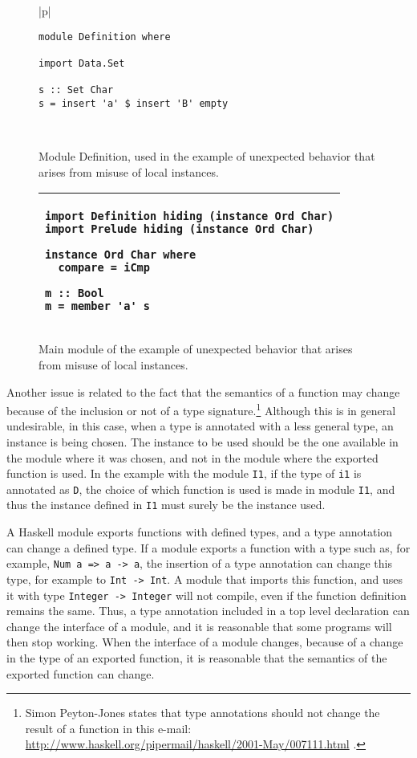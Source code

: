 \documentclass[msc]{ppgccufmg}
\begin{document}
\begin{figure}
\caption{Module Definition, used in the example of unexpected behavior that
  arises from misuse of local instances.\label{definition}}
\begin{tabular}{|p{\textwidth}|}
\hline
\begin{verbatim}
module Definition where

import Data.Set

s :: Set Char
s = insert 'a' $ insert 'B' empty
\end{verbatim}
\\
\hline
\end{tabular}
\end{figure}

\begin{figure}
\caption{Main module of the example of unexpected behavior that arises from
  misuse of local instances.\label{main-set}}
\begin{tabular}{|p{\textwidth}|}
\hline
\begin{verbatim}
import Definition hiding (instance Ord Char)
import Prelude hiding (instance Ord Char)

instance Ord Char where
  compare = iCmp

m :: Bool
m = member 'a' s
\end{verbatim}
\vspace{-0.7cm}\\
\hline
\end{tabular}
\end{figure}

Another issue is related to the fact that the semantics of a function
may change because of the inclusion or not of a type
signature.\footnote{Simon Peyton-Jones states that type annotations
  should not change the result of a function in this e-mail:
  \url{http://www.haskell.org/pipermail/haskell/2001-May/007111.html}
  .} Although this is in general undesirable, in this case, when a
type is annotated with a less general type, an instance is being
chosen.  The instance to be used should be the one available in the
module where it was chosen, and not in the module where the exported
function is used. In the example with the module \texttt{I1}, if the
type of \texttt{i1} is annotated as \texttt{D}, the choice of which
function is used is made in module \texttt{I1}, and thus the instance
defined in \texttt{I1} must surely be the instance used.

A Haskell module exports functions with defined types, and a type
annotation can change a defined type. If a module exports a function
with a type such as, for example, \texttt{Num a => a -> a}, the
insertion of a type annotation can change this type, for example to
\texttt{Int -> Int}. A module that imports this function, and uses it
with type \texttt{Integer -> Integer} will not compile, even if the
function definition remains the same.  Thus, a type annotation
included in a top level declaration can change the interface of a
module, and it is reasonable that some programs will then stop
working.  When the interface of a module changes, because of a change
in the type of an exported function, it is reasonable that the
semantics of the exported function can change.
\end{document}
